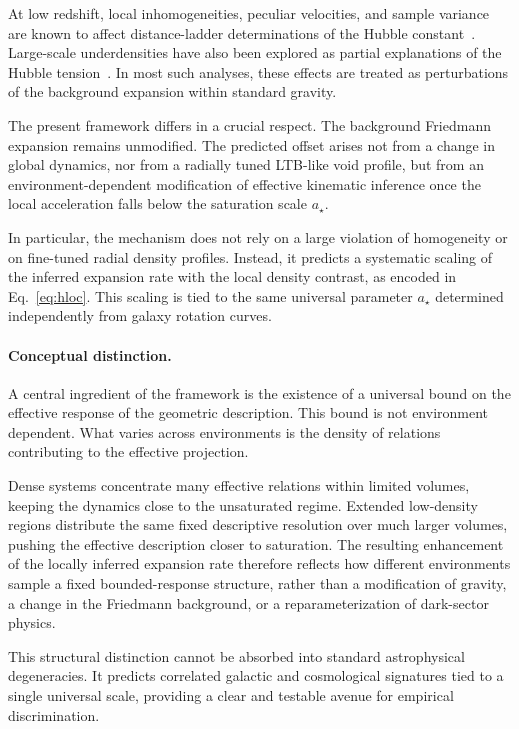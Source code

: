     At low redshift, local inhomogeneities, peculiar velocities,
    and sample variance are known to affect distance-ladder determinations
    of the Hubble constant~\cite{Freedman2021TRGB}.
    Large-scale underdensities have also been explored as partial
    explanations of the Hubble tension~\cite{Shanks2019Void,Kennworthy2019VoidCritique}.
    In most such analyses, these effects are treated as perturbations
    of the background expansion within standard gravity.

    The present framework differs in a crucial respect.
    The background Friedmann expansion remains unmodified.
    The predicted offset arises not from a change in global dynamics,
    nor from a radially tuned LTB-like void profile,
    but from an environment-dependent modification of effective
    kinematic inference once the local acceleration falls below
    the saturation scale $a_\star$.

    In particular, the mechanism does not rely on a large violation
    of homogeneity or on fine-tuned radial density profiles.
    Instead, it predicts a systematic scaling of the inferred expansion rate
    with the local density contrast, as encoded in Eq.~\eqref{eq:hloc}.
    This scaling is tied to the same universal parameter $a_\star$
    determined independently from galaxy rotation curves.

  \paragraph{Conceptual distinction.}

    A central ingredient of the framework is the existence of a universal
    bound on the effective response of the geometric description.
    This bound is not environment dependent.
    What varies across environments is the density of relations contributing
    to the effective projection.

    Dense systems concentrate many effective relations within limited volumes,
    keeping the dynamics close to the unsaturated regime.
    Extended low-density regions distribute the same fixed descriptive
    resolution over much larger volumes, pushing the effective description
    closer to saturation.
    The resulting enhancement of the locally inferred expansion rate
    therefore reflects how different environments sample a fixed
    bounded-response structure, rather than a modification of gravity,
    a change in the Friedmann background, or a reparameterization
    of dark-sector physics.

    This structural distinction cannot be absorbed into standard
    astrophysical degeneracies.
    It predicts correlated galactic and cosmological signatures tied
    to a single universal scale, providing a clear and testable
    avenue for empirical discrimination.
